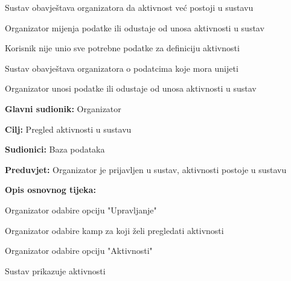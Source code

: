 \begin{packed_item}
\begin{packed_item}
\begin{packed_enum}
							\item Sustav obavještava organizatora da aktivnost već postoji u sustavu
							\item Organizator mijenja podatke ili odustaje od unosa aktivnosti u sustav
							
							\end{packed_enum}
							\item[6.b] Korisnik nije unio sve potrebne podatke za definiciju aktivnosti
							\item[] \begin{packed_enum}
								
								\item Sustav obavještava organizatora o podatcima koje mora unijeti
								\item Organizator unosi podatke ili odustaje od unosa aktivnosti u sustav
								
							\end{packed_enum}
						
							
						\end{packed_item}
					\end{packed_item}
					
					\noindent {}
					\begin{packed_item}
						
						\item \textbf{Glavni sudionik: }Organizator
						\item  \textbf{Cilj:} Pregled aktivnosti u sustavu
						\item  \textbf{Sudionici:} Baza podataka
						\item  \textbf{Preduvjet:} Organizator je prijavljen u sustav, aktivnosti postoje u sustavu
						\item  \textbf{Opis osnovnog tijeka:}
						
						\item[] \begin{packed_enum}
							
							\item Organizator odabire opciju "Upravljanje"
							\item Organizator odabire kamp za koji želi pregledati aktivnosti
							\item Organizator odabire opciju "Aktivnosti"
							\item Sustav prikazuje aktivnosti
						\end{packed_enum}
						
						
					\end{packed_item}
				
